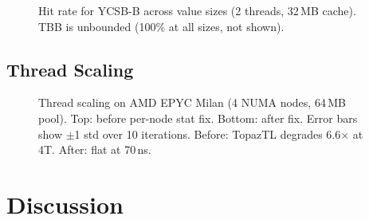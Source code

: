 \documentclass[sigplan,10pt]{acmart}
\begin{document}
\begin{figure}[!ht]
\centering
\resizebox{\columnwidth}{!}{}
\caption{Hit rate for YCSB-B across value sizes (2 threads, 32\,MB cache).
  TBB is unbounded (100\% at all sizes, not shown).}
\label{fig:hitrate}
\end{figure}

%
%

\subsection{Thread Scaling}
\label{sec:eval:scaling}

\begin{figure}[!ht]
\centering
\resizebox{\columnwidth}{!}{}
\caption{Thread scaling on AMD EPYC Milan (4 NUMA nodes, 64\,MB pool).
  Top: before per-node stat fix. Bottom: after fix.
  Error bars show $\pm$1 std over 10 iterations.
  Before: TopazTL degrades 6.6$\times$ at 4T.
  After: flat at 70\,ns.}
\label{fig:scaling}
\end{figure}

%
%
%

\FloatBarrier

\section{Discussion}
\label{sec:discussion}
\end{document}
